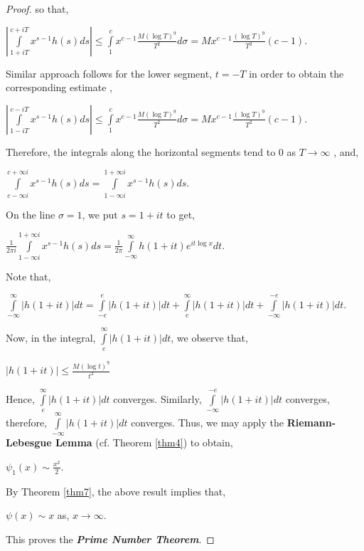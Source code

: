 \documentclass[article,12pt]{elsarticle}
\begin{document}
\begin{proof}
		so that,
		\begin{center}
			$|\int\limits_{1+iT}^{c+iT}x^{s-1}h(s)ds|\leq \int\limits_{1}^{c}x^{c-1}\frac{M(\log T)^{9}}{T^{2}}d\sigma=Mx^{c-1}\frac{(\log T)^{9}}{T^{2}}(c-1)$.
		\end{center}
		Similar approach follows for the lower segment, $t=-T$ in order to obtain the corresponding estimate ,
		\begin{center}
			$|\int\limits_{1-iT}^{c-iT}x^{s-1}h(s)ds|\leq \int\limits_{1}^{c}x^{c-1}\frac{M(\log T)^{9}}{T^{2}}d\sigma=Mx^{c-1}\frac{(\log T)^{9}}{T^{2}}(c-1)$.
		\end{center}
		
		
		Therefore, the integrals along the horizontal segments tend to $0$ as $T\rightarrow \infty$ , and,
		\begin{center}
			$\int\limits_{c-\infty i}^{c+\infty i}x^{s-1}h(s)ds=\int\limits_{1-\infty i}^{1+\infty i}x^{s-1}h(s)ds$.
		\end{center}	
		On the line $\sigma=1$, we put $s=1+it$ to get,
		\begin{center}
			$\frac{1}{2\pi i}\int\limits_{1-\infty i}^{1+\infty i}x^{s-1}h(s)ds=\frac{1}{2\pi}\int\limits_{-\infty}^{\infty}h(1+it)e^{it\log x}dt$.
		\end{center}	
		Note that,
		\begin{center}
			$\int\limits_{-\infty}^{\infty}|h(1+it)| dt=\int\limits_{-e}^{e}|h(1+it)| dt+\int\limits_{e}^{\infty}|h(1+it)| dt+\int\limits_{-\infty}^{-e}|h(1+it)| dt$.
		\end{center}	
		Now, in the integral, $\int\limits_{e}^{\infty}|h(1+it)| dt$, we observe that,
		\begin{center}
			$|h(1+it)|\leq \frac{M(\log t)^{9}}{t^{2}}$
		\end{center}	
		
		Hence, $\int\limits_{e}^{\infty}|h(1+it)|dt$ converges.	Similarly,  $\int\limits_{-\infty}^{-e}|h(1+it)|dt$ converges, therefore,  $\int\limits_{-\infty}^{\infty}|h(1+it)|dt$ converges. Thus, we may apply the \textbf{Riemann-Lebesgue Lemma} (cf. Theorem \eqref{thm4}) to obtain, 
		\begin{center}
			$\psi_{1}(x)\sim \frac{x^{2}}{2}$.
		\end{center}
		By Theorem \eqref{thm7}, the above result implies that, 
		\begin{center}
			$\psi(x)\sim x$ as,  $x\rightarrow \infty$.
		\end{center}	
		This proves the \textit{\textbf{Prime Number Theorem}}.
		
	\end{proof}
	
\end{document}
